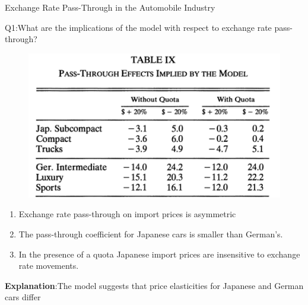 \documentclass{beamer}
\begin{document}
\begin{frame}{Exchange Rate Pass-Through in the Automobile Industry}

   Q1:What are the implications of the 	   model with respect to exchange rate pass-through?

	   \begin{figure}[h]
		   \centering          			
		   \includegraphics[scale=0.8]{table9.png}
		   \end{figure} 

   \begin{enumerate}
	   \item Exchange rate pass-through on import prices is asymmetric %
	   \item The pass-through coefficient for Japanese cars is smaller than German's.
	   \item In the presence of a quota Japanese import prices are insensitive to exchange rate movements.
	  
	 \end{enumerate}

	 \textbf{Explanation}:The model suggests that price elasticities for Japanese and German cars differ

\end{frame}	




\end{document}
